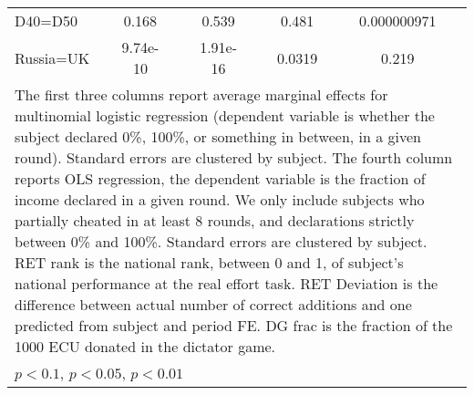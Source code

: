 \begin{tabular}{l|cccccc|cc}
D40=D50         &    0.168         &         &    0.539         &         &    0.481         &         &0.000000971         &         \\
Russia=UK       & 9.74e-10         &         & 1.91e-16         &         &   0.0319         &         &    0.219         &         \\
\hline\hline
\multicolumn{9}{p{16cm}}{\tiny The first three columns report average marginal effects for multinomial logistic regression (dependent variable is whether the subject declared 0\%, 100\%, or something in between, in a given round). Standard errors are clustered by subject. The fourth column reports OLS regression, the dependent variable is the fraction of income declared in a given round. We only include subjects who partially cheated in at least 8 rounds, and declarations strictly between 0\% and 100\%. Standard errors are clustered by subject. RET rank is the national rank, between 0 and 1, of subject's national performance at the real effort task. RET Deviation is the difference between actual number of correct additions and one predicted from subject and period FE. DG frac is the fraction of the 1000 ECU donated in the dictator game.}\\
\multicolumn{9}{l}{\tiny \sym{*} \(p<0.1\), \sym{**} \(p<0.05\), \sym{***} \(p<0.01\)}\\
\end{tabular}